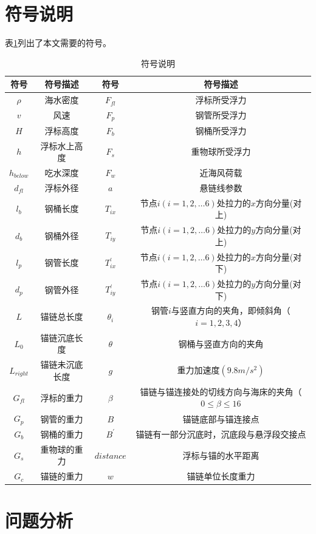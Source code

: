 \documentclass{cumcm}
\begin{document}
\section{符号说明}
表\ref{table-symbol}列出了本文需要的符号。
\begin{table}[H]
	\centering
	\caption{符号说明} \label{table-symbol}
	\begin{tabular*}{\textwidth}{cc||cc}
		\hline
		符号 & 符号描述 & 符号 & 符号描述 \\
		\hline
		$\rho$ & 海水密度 & $F_{fl}$ & 浮标所受浮力\\
		$v$ & 风速& $F_{p}$ & 钢管所受浮力\\
		$H$ & 浮标高度 & $F_{b}$ & 钢桶所受浮力\\
		$h$ & 浮标水上高度& $F_{s}$ & 重物球所受浮力\\
		$h_{below}$ & 吃水深度 & $F_w$ & 近海风荷载\\
		$d_{fl}$ & 浮标外径&$a$ & 悬链线参数\\
		$l_b$ & 钢桶长度& $T_{ix}$ & 节点$i(i=1,2,\dots6)$处拉力的$x$方向分量(对上)\\
		$d_b$ & 钢桶外径& $T_{iy}$ & 节点$i(i=1,2,\dots6)$处拉力的$y$方向分量(对上)\\
		$l_p$ & 钢管长度&$T_{ix}^{'}$ & 节点$i(i=1,2,\dots6)$处拉力的$x$方向分量(对下)\\
		$d_p$ & 钢管外径&$T_{iy}^{'}$ & 节点$i(i=1,2,\dots6)$处拉力的$y$方向分量(对下)\\
		$L$ & 锚链总长度& $\theta_i$ & 钢管$i$与竖直方向的夹角，即倾斜角（$i=1,2,3,4$）\\
		$L_{0}$ & 锚链沉底长度&$\theta$ & 钢桶与竖直方向的夹角\\
		$L_{right}$ & 锚链未沉底长度 & $g$ & 重力加速度$(9.8m/s^2)$ \\
		$G_{fl}$ & 浮标的重力&$\beta$ & 锚链与锚连接处的切线方向与海床的夹角（$0\le\beta\le16$\\
		$G_{p}$ & 钢管的重力&$B$ & 锚链底部与锚连接点\\
		$G_{b}$ & 钢桶的重力&$B^{'}$ & 锚链有一部分沉底时，沉底段与悬浮段交接点\\
		$G_{s}$ & 重物球的重力&$distance$ & 浮标与锚的水平距离\\
		$G_{c}$ & 锚链的重力& $w$ & 锚链单位长度重力\\
		\hline
	\end{tabular*}
\end{table}

\section{问题分析}
\end{document}

